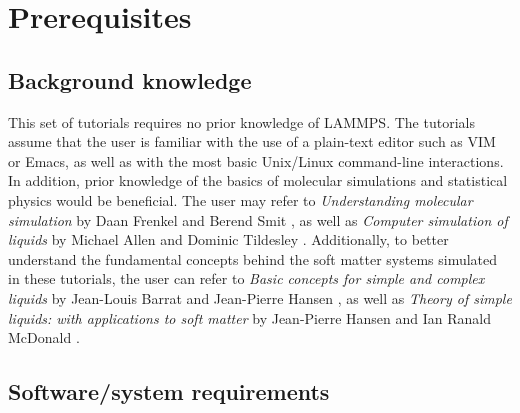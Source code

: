 \documentclass[9pt,tutorial]{livecoms}
\begin{document}
\section{Prerequisites}


\subsection{Background knowledge}

This set of tutorials requires no prior knowledge of LAMMPS. The tutorials assume that the user is familiar with the use of a plain-text editor such as VIM or Emacs, as well as with the most basic Unix/Linux command-line interactions. In addition, prior knowledge of the basics of molecular simulations and statistical physics would be beneficial. The user may refer to \textit{Understanding molecular simulation} by Daan Frenkel and Berend Smit \cite{frenkel2023understanding}, as well as \textit{Computer simulation of liquids} by Michael Allen and Dominic Tildesley \cite{allen2017computer}. Additionally, to better understand the fundamental concepts behind the soft matter systems simulated in these tutorials, the user can refer to \textit{Basic concepts for simple and complex liquids} by Jean-Louis Barrat and Jean-Pierre Hansen \cite{barrat2003basic}, as well as \textit{Theory of simple liquids: with applications to soft matter} by Jean-Pierre Hansen and Ian Ranald McDonald \cite{hansen2013theory}.

\subsection{Software/system requirements}
\end{document}
